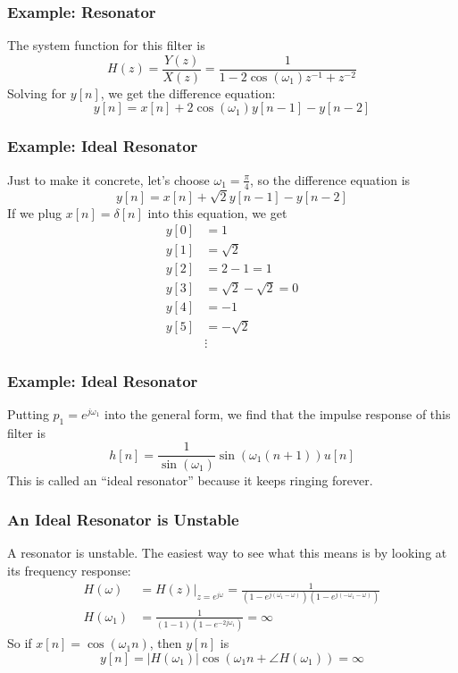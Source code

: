 \documentclass{beamer}
\begin{document}
\begin{frame}
  \frametitle{Example: Resonator}

  The system function for this filter is
  \[
  H(z) = \frac{Y(z)}{X(z)} = \frac{1}{1-2\cos(\omega_1) z^{-1} + z^{-2}}
  \]
  Solving for $y[n]$, we get the difference equation:
  \[
  y[n] = x[n] + 2\cos(\omega_1) y[n-1] - y[n-2]
  \]
\end{frame}

\begin{frame}
  \frametitle{Example: Ideal Resonator}

  Just to make it concrete, let's choose $\omega_1=\frac{\pi}{4}$, so
  the difference equation is 
  \[
  y[n] = x[n] + \sqrt{2} y[n-1] - y[n-2]
  \]
  If we plug $x[n]=\delta[n]$ into this equation, we get
  \begin{align*}
    y[0] &= 1\\
    y[1] &= \sqrt{2}\\
    y[2] &= 2-1 =1\\
    y[3] &= \sqrt{2}-\sqrt{2}=0\\
    y[4] &= -1\\
    y[5] &= -\sqrt{2}\\
    &\vdots
  \end{align*}
\end{frame}

\begin{frame}
  \frametitle{Example: Ideal Resonator}

  Putting $p_1=e^{j\omega_1}$ into the general form, we find that the
  impulse response of this filter is
  \[
  h[n] = \frac{1}{\sin(\omega_1)}\sin(\omega_1 (n+1))u[n]
  \]
  This is called an ``ideal resonator'' because it keeps ringing forever.
  
\end{frame}

\begin{frame}
  \centerline{}
\end{frame}

\begin{frame}
  \frametitle{An Ideal  Resonator is Unstable}

  A resonator is unstable.  The easiest way to see what this means is
  by looking at its frequency response:
  \begin{align*}
    H(\omega) &= H(z)\vert_{z=e^{j\omega}} = \frac{1}{(1-e^{j(\omega_1-\omega)})(1-e^{j(-\omega_1-\omega)})}\\
    H(\omega_1) &= \frac{1}{(1-1)(1-e^{-2j\omega_1})} = \infty
  \end{align*}
  So if $x[n]=\cos(\omega_1 n)$, then $y[n]$ is
  \begin{displaymath}
    y[n] = |H(\omega_1)|\cos\left(\omega_1 n+\angle H(\omega_1)\right) = \infty
  \end{displaymath}
\end{frame}
\end{document}
